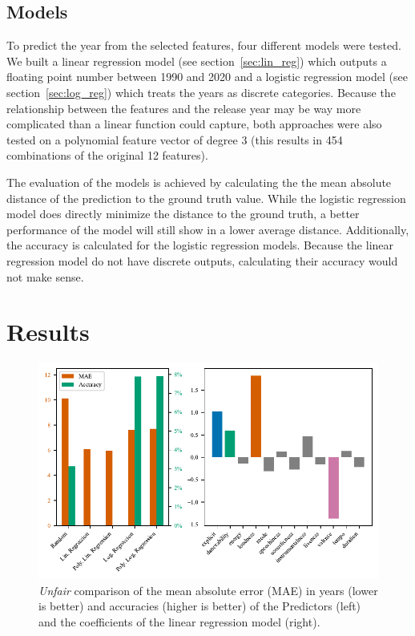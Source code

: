 \documentclass{article}
\begin{document}
\subsection{Models}

To predict the year from the selected features, four different models were tested. We built a linear regression model (see section~\ref{sec:lin_reg}) which outputs a floating point number between 1990 and 2020 and a logistic regression model (see section~\ref{sec:log_reg}) which treats the years as discrete categories. Because the relationship between the features and the release year may be way more complicated than a linear function could capture, both approaches were also tested on a polynomial feature vector of degree 3 (this results in 454 combinations of the original 12 features). 

The evaluation of the models is achieved by calculating the the mean absolute distance of the prediction to the ground truth value. While the logistic regression model does directly minimize the distance to the ground truth, a better performance of the model will still show in a lower average distance. Additionally, the accuracy is calculated for the logistic regression models. Because the linear regression model do not have discrete outputs, calculating their accuracy would not make sense. 
\newpage
\section{Results}
\begin{figure}[t]
  \centering
  \includegraphics{losses_lincoefs}
  \caption{\emph{Unfair} comparison of the mean absolute error (MAE) in years (lower is better) and accuracies (higher is better) of the Predictors (left) and the coefficients of the linear regression model (right).}
  \label{fig:losses_lincoefs}
\end{figure}
\end{document}

